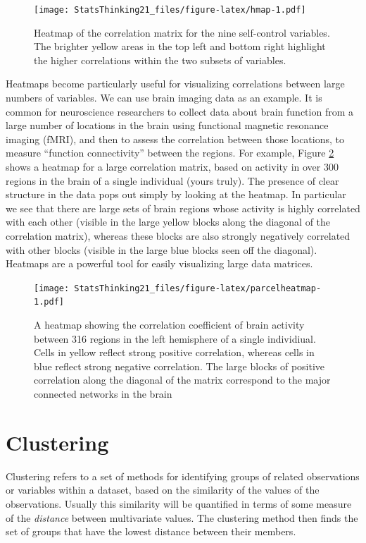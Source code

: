 \documentclass[
  12pt,
]{book}
\begin{document}
\begin{figure}
\centering
\texttt{[image: StatsThinking21\_files/figure-latex/hmap-1.pdf]}
\caption{\label{fig:hmap}Heatmap of the correlation matrix for the nine self-control variables. The brighter yellow areas in the top left and bottom right highlight the higher correlations within the two subsets of variables.}
\end{figure}

Heatmaps become particularly useful for visualizing correlations between large numbers of variables. We can use brain imaging data as an example. It is common for neuroscience researchers to collect data about brain function from a large number of locations in the brain using functional magnetic resonance imaging (fMRI), and then to assess the correlation between those locations, to measure ``function connectivity'' between the regions. For example, Figure \ref{fig:parcelheatmap} shows a heatmap for a large correlation matrix, based on activity in over 300 regions in the brain of a single individual (yours truly). The presence of clear structure in the data pops out simply by looking at the heatmap. In particular we see that there are large sets of brain regions whose activity is highly correlated with each other (visible in the large yellow blocks along the diagonal of the correlation matrix), whereas these blocks are also strongly negatively correlated with other blocks (visible in the large blue blocks seen off the diagonal). Heatmaps are a powerful tool for easily visualizing large data matrices.

\begin{figure}
\centering
\texttt{[image: StatsThinking21\_files/figure-latex/parcelheatmap-1.pdf]}
\caption{\label{fig:parcelheatmap}A heatmap showing the correlation coefficient of brain activity between 316 regions in the left hemisphere of a single individiual. Cells in yellow reflect strong positive correlation, whereas cells in blue reflect strong negative correlation. The large blocks of positive correlation along the diagonal of the matrix correspond to the major connected networks in the brain}
\end{figure}

\hypertarget{clustering}{%
\section{Clustering}\label{clustering}}

Clustering refers to a set of methods for identifying groups of related observations or variables within a dataset, based on the similarity of the values of the observations. Usually this similarity will be quantified in terms of some measure of the \emph{distance} between multivariate values. The clustering method then finds the set of groups that have the lowest distance between their members.
\end{document}

